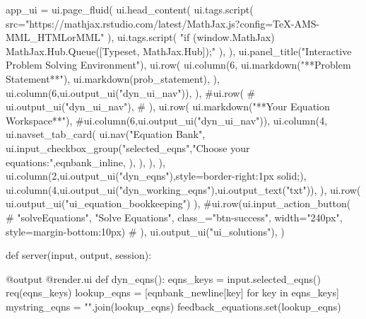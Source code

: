 \documentclass[
  letterpaper,
  DIV=11,
  numbers=noendperiod]{scrreprt}
\newenvironment{Shaded}{\begin{snugshade}}{\end{snugshade}}
\newcommand{\NormalTok}[1]{\textcolor[rgb]{0.00,0.23,0.31}{#1}}
\begin{document}
\begin{Shaded}
\begin{Highlighting}[]
\NormalTok{app\_ui = ui.page\_fluid(}
\NormalTok{    ui.head\_content(}
\NormalTok{        ui.tags.script(}
\NormalTok{            src="https://mathjax.rstudio.com/latest/MathJax.js?config=TeX{-}AMS{-}MML\_HTMLorMML"}
\NormalTok{        ),}
\NormalTok{        ui.tags.script(}
\NormalTok{            "if (window.MathJax) MathJax.Hub.Queue([\textquotesingle{}Typeset\textquotesingle{}, MathJax.Hub]);"}
\NormalTok{        ),}
\NormalTok{    ),}
\NormalTok{    ui.panel\_title("Interactive Problem Solving Environment"),}
\NormalTok{        ui.row(}
\NormalTok{            ui.column(6,}
\NormalTok{                ui.markdown("**Problem Statement**"),}
\NormalTok{                ui.markdown(prob\_statement),}
\NormalTok{                ),}
\NormalTok{            ui.column(6,ui.output\_ui("dyn\_ui\_nav")),}
\NormalTok{            ),}
\NormalTok{        \#ui.row(}
\NormalTok{        \#    ui.output\_ui("dyn\_ui\_nav"),}
\NormalTok{        \#    ),}
\NormalTok{        ui.row(}
\NormalTok{            ui.markdown("**Your Equation Workspace**"),}
\NormalTok{            \#ui.column(6,ui.output\_ui("dyn\_ui\_nav")),}
\NormalTok{            ui.column(4,}
\NormalTok{                ui.navset\_tab\_card(}
\NormalTok{                    ui.nav("Equation Bank",}
\NormalTok{                        ui.input\_checkbox\_group("selected\_eqns","Choose your equations:",eqnbank\_inline,}
\NormalTok{                        ),}
\NormalTok{                    ),}
\NormalTok{                ),}
\NormalTok{            ),}
\NormalTok{            ui.column(2,ui.output\_ui("dyn\_eqns"),style=\textquotesingle{}border{-}right:1px solid;\textquotesingle{}),}
\NormalTok{            ui.column(4,ui.output\_ui("dyn\_working\_eqns"),ui.output\_text("txt")),}
\NormalTok{        ),}
\NormalTok{        ui.row(}
\NormalTok{          ui.output\_ui("ui\_equation\_bookkeeping")}
\NormalTok{        ),}
\NormalTok{        \#ui.row(ui.input\_action\_button(}
\NormalTok{        \#            "solveEquations", "Solve Equations", class\_="btn{-}success", width="240px", style=\textquotesingle{}margin{-}bottom:10px\textquotesingle{})}
\NormalTok{        \#      ),}
\NormalTok{        ui.output\_ui("ui\_solutions"),}
\NormalTok{)}


\NormalTok{def server(input, output, session):}
   
\NormalTok{    @output}
\NormalTok{    @render.ui}
\NormalTok{    def dyn\_eqns():}
\NormalTok{        eqns\_keys = input.selected\_eqns()}
\NormalTok{        req(eqns\_keys)}
\NormalTok{        lookup\_eqns = [eqnbank\_newline[key] for key in eqns\_keys]}
\NormalTok{        mystring\_eqns = "".join(lookup\_eqns)}
\NormalTok{        feedback\_equations.set(lookup\_eqns)}


\end{Highlighting}
\end{Shaded}
\end{document}
